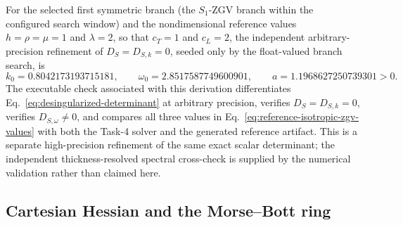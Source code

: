 For the selected first symmetric branch (the \(S_1\)-ZGV branch within the
configured search window) and the nondimensional reference values
\(
  h=\rho=\mu=1
\) and \(\lambda=2\), so that \(c_T=1\) and \(c_L=2\), the independent
arbitrary-precision refinement of \(D_S=D_{S,k}=0\), seeded only by the
float-valued branch search, is
\begin{equation}
  k_0=0.8042173193715181,
  \qquad
  \omega_0=2.8517587749600901,
  \qquad
  a=1.1968627250739301>0.
  \label{eq:reference-isotropic-zgv-values}
\end{equation}
The executable check associated with this derivation differentiates
Eq.~\eqref{eq:desingularized-determinant} at arbitrary precision, verifies
\(D_S=D_{S,k}=0\), verifies \(D_{S,\omega}\neq0\), and compares all three
values in Eq.~\eqref{eq:reference-isotropic-zgv-values} with both the Task-4
solver and the generated reference artifact.  This is a separate
high-precision refinement of the same exact scalar determinant; the
independent thickness-resolved spectral cross-check is supplied by the
numerical validation rather than claimed here.

\subsection{Cartesian Hessian and the Morse--Bott ring}

